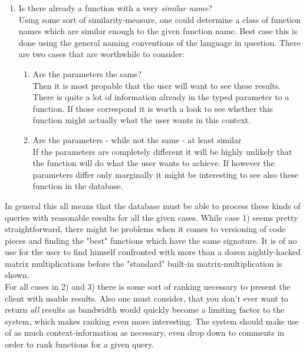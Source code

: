 \documentclass[twoside, 11pt]{scrartcl}
\begin{document}
\begin{enumerate}
	\item Is there already a function with a very \emph{similar name}?\\
Using some sort of similarity-measure, one could determine a class of function names which are similar enough to the given function name. Best case this is done using the general naming conventions of the language in question. There are two cases that are worthwhile to consider:
	\begin{enumerate}
		\item Are the parameters the same?\\
Then it is most propable that the user will want to see these results. There is quite a lot of information already in the typed parameter to a function. If those correspond it is worth a look to see whether this function might actually what the user wants in this context.
		\item Are the parameters - while not the same - at least similar\\
If the parameters are completely different it will be highly unlikely that the function will do what the user wants to achieve. If however the parameters differ only marginally it might be interesting to see also these function in the database.
	\end{enumerate}
\end{enumerate}

In general this all means that the database must be able to process these kinds of queries with reasonable results for all the given cases. While case 1) seems pretty straightforward, there might be problems when it comes to versioning of code pieces and finding the "best" functions which have the same signature. It is of no use for the user to find himself confronted with more than a dozen nightly-hacked matrix multiplications before the "standard" built-in matrix-multiplication is shown. \\
For all cases in 2) and 3) there is some sort of ranking necessary to present the client with usable results. Also one must consider, that you don't ever want to return \emph{all} results as bandwidth would quickly become a limiting factor to the system, which makes ranking even more interesting.
The system should make use of as much context-information as necessary, even drop down to comments in order to rank functions for a given query.\\
\end{document}
